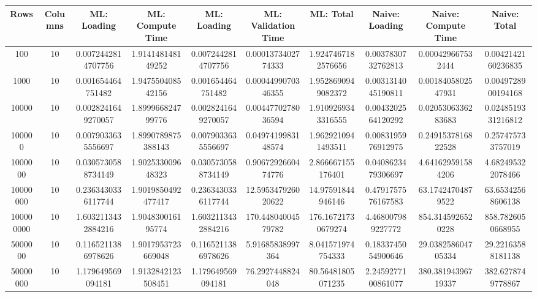 \begin{table}[htb]
    \centering
    \begin{tabular}{@{}cccccccccc@{}}
        \toprule
        Rows & Columns & ML: Loading & ML: Compute Time & ML: Loading & ML: Validation Time & ML: Total & Naive: Loading & Naive: Compute Time & Naive: Total \\
        \midrule
        100 & 10 & 0.0072442814707756 & 1.914148148149252 & 0.0072442814707756 & 0.0001373402774333 & 1.9247467182576656 & 0.0037830732762813 & 0.000429667532444 & 0.0042142160236835 \\
        1000 & 10 & 0.001654464751482 & 1.947550408542156 & 0.001654464751482 & 0.0004499070346355 & 1.9528690949082372 & 0.0031314045190811 & 0.0018405802547931 & 0.0049728900194168 \\
        10000 & 10 & 0.0028241649270057 & 1.899966824799776 & 0.0028241649270057 & 0.0044770278036594 & 1.9109269343316555 & 0.0043202564120292 & 0.0205306336283683 & 0.0248519331216812 \\
        100000 & 10 & 0.0079033635556697 & 1.8990789875388143 & 0.0079033635556697 & 0.0497419983148574 & 1.9629210941493511 & 0.0083195976912975 & 0.2491537816822528 & 0.257475733757019 \\
        1000000 & 10 & 0.0305730588734149 & 1.902533009648323 & 0.0305730588734149 & 0.9067292660474776 & 2.866667155176401 & 0.0408623479306697 & 4.641629591584206 & 4.682495322078466 \\
        10000000 & 10 & 0.2363430336117744 & 1.9019850492477417 & 0.2363430336117744 & 12.595347926020622 & 14.97591844946146 & 0.4791757576167583 & 63.17424704879522 & 63.65342568606138 \\
        100000000 & 10 & 1.6032113432884216 & 1.904830016195774 & 1.6032113432884216 & 170.44804004579782 & 176.16721730679274 & 4.468007989227772 & 854.3145926520228 & 858.7826050668955 \\
        5000000 & 10 & 0.1165211386978626 & 1.9017953723669048 & 0.1165211386978626 & 5.91685838997364 & 8.041571974754333 & 0.1833745054900646 & 29.038258604705334 & 29.22163588181138 \\
        50000000 & 10 & 1.179649569094181 & 1.9132842123508451 & 1.179649569094181 & 76.2927448824048 & 80.56481805071235 & 2.2459277100861077 & 380.38194396719337 & 382.6278749778867 \\
        \bottomrule
    \end{tabular}
\end{table}